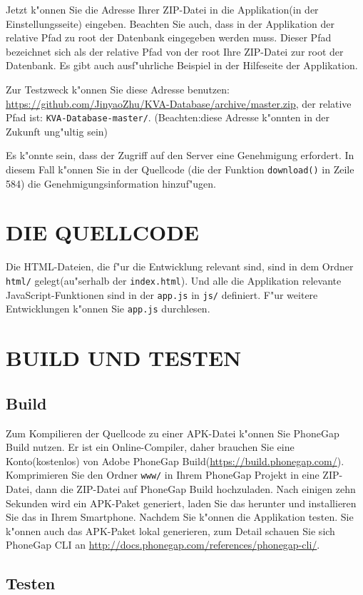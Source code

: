 \documentclass[a4paper,11pt,twoside]{article}
\begin{document}
Jetzt k"onnen Sie die Adresse Ihrer ZIP-Datei in die Applikation(in der Einstellungsseite) eingeben. Beachten Sie auch, dass in der Applikation der relative Pfad zu root der Datenbank eingegeben werden muss. Dieser Pfad bezeichnet sich als der relative Pfad von der root Ihre ZIP-Datei zur root der Datenbank. Es gibt auch ausf"uhrliche Beispiel in der Hilfeseite der Applikation. 

Zur Testzweck k"onnen Sie diese Adresse benutzen: \url{https://github.com/JinyaoZhu/KVA-Database/archive/master.zip}, der relative Pfad ist: \texttt{KVA-Database-master/}. (Beachten:diese Adresse k"onnten in der Zukunft ung"ultig sein)

Es k"onnte sein, dass der Zugriff auf den Server eine Genehmigung erfordert. In diesem Fall k"onnen Sie in der Quellcode (die der Funktion \texttt{download()} in Zeile 584) die Genehmigungsinformation hinzuf"ugen.

\section{DIE QUELLCODE}
Die HTML-Dateien, die f"ur die Entwicklung relevant sind, sind in dem Ordner \texttt{html/} gelegt(au"serhalb der \texttt{index.html}). Und alle die Applikation relevante JavaScript-Funktionen sind in der \texttt{app.js} in \texttt{js/} definiert. F"ur weitere Entwicklungen k"onnen Sie \texttt{app.js} durchlesen.

\section{BUILD UND TESTEN}
\subsection{Build}
Zum Kompilieren der Quellcode zu einer APK-Datei k"onnen Sie PhoneGap Build nutzen. Er ist ein Online-Compiler, daher brauchen Sie eine Konto(kostenlos) von Adobe PhoneGap Build(\url{https://build.phonegap.com/}). Komprimieren Sie den Ordner \texttt{www/} in Ihrem PhoneGap Projekt in eine ZIP-Datei, dann die ZIP-Datei auf PhoneGap Build hochzuladen. Nach einigen zehn Sekunden wird ein APK-Paket generiert, laden Sie das herunter und installieren Sie das in Ihrem Smartphone. Nachdem Sie k"onnen die Applikation testen. Sie k"onnen auch das APK-Paket lokal generieren, zum Detail schauen Sie sich PhoneGap CLI an \url{http://docs.phonegap.com/references/phonegap-cli/}.
\subsection{Testen}
\end{document}
